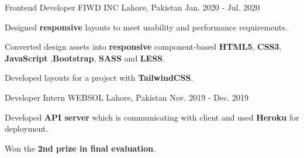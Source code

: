 \begin{cventries}
  \cventry
    {Frontend Developer} %
    {FIWD INC} %
    {Lahore, Pakistan} %
    {Jan. 2020 - Jul. 2020} %
    {
      \begin{cvitems} %
        \item {Designed \textbf{responsive} layouts to meet usability and performance requirements.}
        \item {Converted design assets into \textbf{responsive} component-based \textbf{HTML5}, \textbf{CSS3}, \textbf{JavaScript} ,\textbf{Bootstrap}, \textbf{SASS} and \textbf{LESS}.}
        \item {Developed layouts for a project with \textbf{TailwindCSS}.}
        \end{cvitems}
    }

  \cventry
    {Developer Intern} %
    {WEBSOL} %
    {Lahore, Pakistan} %
    {Nov. 2019 - Dec. 2019} %
    {
      \begin{cvitems} %
        \item {Developed \textbf{API server} which is communicating with client and used \textbf{Heroku} for deployment.}
        \item {Won the \textbf{2nd prize in final evaluation}.}
      \end{cvitems}
    }

\end{cventries}
